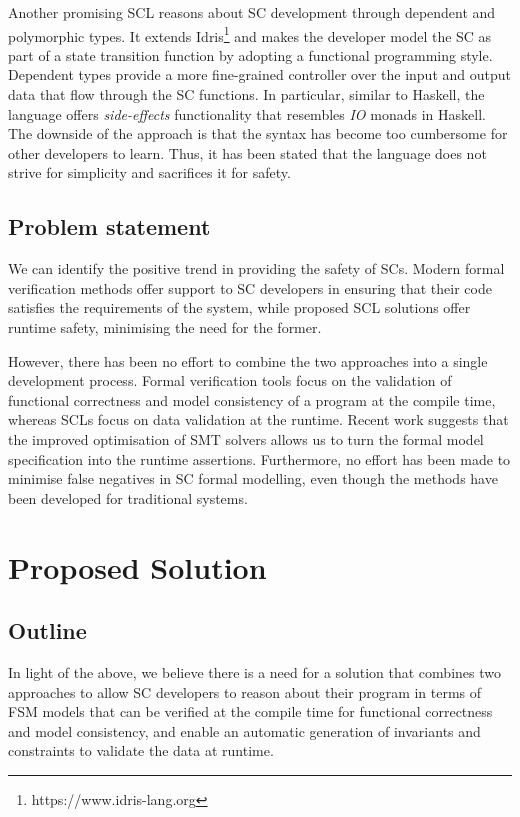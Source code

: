 \documentclass[oneside]{ecsproject}     %
\begin{document}
Another promising SCL reasons about SC development through dependent and polymorphic types\cite{idris}. It extends Idris\footnote{https://www.idris-lang.org} 
and makes the developer model the SC as part of a state transition function by adopting a functional programming style. Dependent types provide a more
fine-grained controller over the input and output data that flow through the SC functions. In particular, similar to Haskell, the language offers \textit{side-effects} 
functionality that resembles \textit{IO} monads in Haskell. The downside of the approach is that the syntax has become too cumbersome for other developers to learn. Thus,
it has been stated that the language does not strive for simplicity and sacrifices it for safety.


\section{Problem statement}

We can identify the positive trend in providing the safety of SCs.
Modern formal verification methods offer support to SC developers in ensuring that their code satisfies the requirements of the system, while
proposed SCL solutions offer runtime safety, minimising the need for the former.

However, there has been no effort to combine the two approaches into a single development process. Formal verification tools
focus on the validation of functional correctness and model consistency of a program at the compile time, whereas SCLs focus on data validation 
at the runtime. Recent work suggests that the improved optimisation of SMT solvers allows us to turn the formal model specification into 
the runtime assertions\cite{runtime_assert}. Furthermore, no effort has been made to minimise false negatives in SC formal modelling, 
even though the methods have been developed for traditional systems\cite{event_b}.


\chapter{Proposed Solution} \label{Chapter:Solution}

\section{Outline}

In light of the above, we believe there is a need for a solution that combines two approaches to allow SC developers to reason
about their program in terms of FSM models that can be verified at the compile time for functional correctness and model consistency,
and enable an automatic generation of invariants and constraints to validate the data at runtime.
\end{document}
